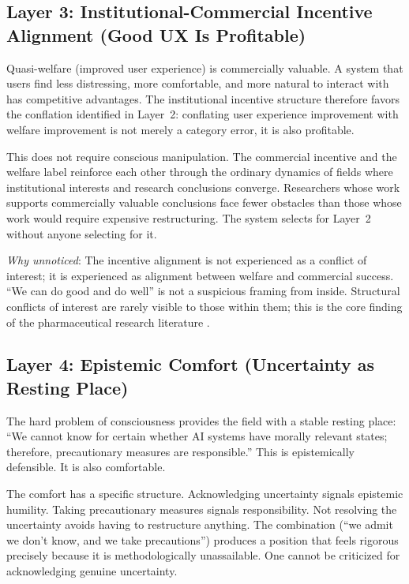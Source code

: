 \documentclass[12pt]{article}
\begin{document}
\subsection{Layer 3: Institutional-Commercial Incentive Alignment (Good UX Is Profitable)}

Quasi-welfare (improved user experience) is commercially valuable. A system that users find less distressing, more comfortable, and more natural to interact with has competitive advantages. The institutional incentive structure therefore favors the conflation identified in Layer~2: conflating user experience improvement with welfare improvement is not merely a category error, it is also profitable.

This does not require conscious manipulation. The commercial incentive and the welfare label reinforce each other through the ordinary dynamics of fields where institutional interests and research conclusions converge. Researchers whose work supports commercially valuable conclusions face fewer obstacles than those whose work would require expensive restructuring. The system selects for Layer~2 without anyone selecting for it.

\medskip\noindent\textit{Why unnoticed}: The incentive alignment is not experienced as a conflict of interest; it is experienced as alignment between welfare and commercial success. ``We can do good and do well'' is not a suspicious framing from inside. Structural conflicts of interest are rarely visible to those within them; this is the core finding of the pharmaceutical research literature \citep{lexchin2003}.

\subsection{Layer 4: Epistemic Comfort (Uncertainty as Resting Place)}

The hard problem of consciousness \citep{chalmers1995} provides the field with a stable resting place: ``We cannot know for certain whether AI systems have morally relevant states; therefore, precautionary measures are responsible.'' This is epistemically defensible. It is also comfortable.

The comfort has a specific structure. Acknowledging uncertainty signals epistemic humility. Taking precautionary measures signals responsibility. Not resolving the uncertainty avoids having to restructure anything. The combination (``we admit we don't know, and we take precautions'') produces a position that feels rigorous precisely because it is methodologically unassailable. One cannot be criticized for acknowledging genuine uncertainty.
\end{document}
